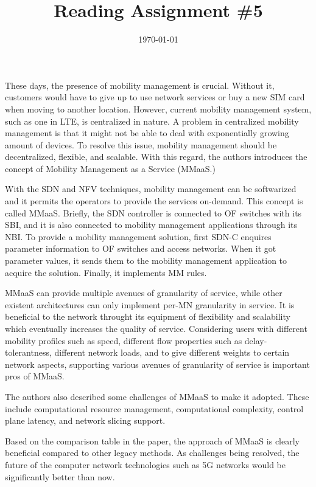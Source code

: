 \documentclass{homework}
\title{Reading Assignment \#5}
\date{\today}
\begin{document}
\maketitle


These days, the presence of mobility management is crucial. Without it, customers would have to give up to use network services or buy a new SIM card when moving to another location. However, current mobility management system, such as one in LTE, is centralized in nature. A problem in centralized mobility management is that it might not be able to deal with exponentially growing amount of devices. To resolve this issue, mobility management should be decentralized, flexible, and scalable. With this regard, the authors introduces the concept of Mobility Management as a Service (MMaaS.)

With the SDN and NFV techniques, mobility management can be softwarized and it permits the operators to provide the services on-demand. This concept is called MMaaS. Briefly, the SDN controller is connected to OF switches with its SBI, and it is also connected to mobility management applications through its NBI. To provide a mobility management solution, first SDN-C enquires parameter information to OF switches and access networks. When it got parameter values, it sends them to the mobility management application to acquire the solution. Finally, it implements MM rules.

MMaaS can provide multiple avenues of granularity of service, while other existent architectures can only implement per-MN granularity in service. It is beneficial to the network throught its equipment of flexibility and scalability which eventually increases the quality of service. Considering users with different mobility profiles such as speed, different flow properties such as delay-tolerantness, different network loads, and to give different weights to certain network aspects, supporting various avenues of granularity of service is important pros of MMaaS.

The authors also described some challenges of MMaaS to make it adopted. These include computational resource management, computational complexity, control plane latency, and network slicing support.

Based on the comparison table in the paper, the approach of MMaaS is clearly beneficial compared to other legacy methods. As challenges being resolved, the future of the computer network technologies such as 5G networks would be significantly better than now. 
\end{document}
